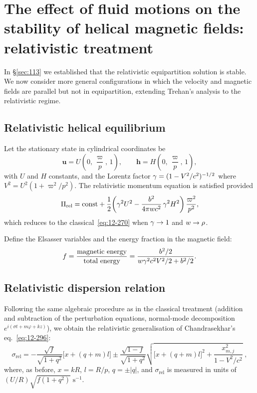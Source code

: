 \section{The effect of fluid motions on the stability of helical
magnetic fields: relativistic treatment}
\label{sec:rel-114}

In \S\ref{sec:113} we established that the relativistic equipartition
solution is stable.  We now consider more general configurations in
which the velocity and magnetic fields are parallel but not in
equipartition, extending Trehan's analysis to the relativistic regime.

\subsection{Relativistic helical equilibrium}
\label{sec:rel-114-equil}

Let the stationary state in cylindrical coordinates be
\begin{equation}
\label{eq:rel-114-equil}
\mathbf{u} = U\!\left(0,\,\frac{\varpi}{p},\,1\right),
\qquad
\mathbf{h} = H\!\left(0,\,\frac{\varpi}{p},\,1\right),
\end{equation}
with $U$ and $H$ constants, and the Lorentz factor
$\gamma = (1 - V^{2}/c^{2})^{-1/2}$ where
$V^{2} = U^{2}(1 + \varpi^{2}/p^{2})$.  The relativistic momentum
equation is satisfied provided
\begin{equation}
\label{eq:rel-114-Pi}
\Pi_{\mathrm{rel}} = \text{const}
  + \frac{1}{2}\!\left(\gamma^{2}U^{2}
  - \frac{b^{2}}{4\pi w c^{2}}\,\gamma^{2}H^{2}
  \right)\frac{\varpi^{2}}{p^{2}},
\end{equation}
which reduces to the classical~\eqref{eq:12-270} when $\gamma \to 1$ and
$w \to \rho$.

Define the Elsasser variables and the energy fraction in the magnetic
field:
\begin{equation}
\label{eq:rel-114-f}
f = \frac{\text{magnetic energy}}{\text{total energy}}
  = \frac{b^{2}/2}{w\gamma^{2}c^{2}V^{2}/2 + b^{2}/2}.
\end{equation}

\subsection{Relativistic dispersion relation}
\label{sec:rel-114-disp}

Following the same algebraic procedure as in the classical treatment
(addition and subtraction of the perturbation equations, normal-mode
decomposition $e^{i(\sigma t + m\varphi + kz)}$), we obtain the
relativistic generalisation of Chandrasekhar's eq.~\eqref{eq:12-296}:
\begin{equation}
\label{eq:rel-114-sigma}
\boxed{
\sigma_{\mathrm{rel}} =
  -\frac{\sqrt{f}}{\sqrt{1+q^{2}}}
  \bigl[x + (q+m)l\bigr]
  \pm \frac{\sqrt{1-f}}{\sqrt{1+q^{2}}}
  \sqrt{\bigl[x+(q+m)l\bigr]^{2}
    + \frac{x_{m,j}^{2}}{1 - V^{2}/c^{2}}}
}\;,
\end{equation}
where, as before, $x = kR$, $l = R/p$, $q = \pm|q|$, and
$\sigma_{\mathrm{rel}}$ is measured in units of
$(U/R)\sqrt{f(1+q^{2})}\;\mathrm{s}^{-1}$.

